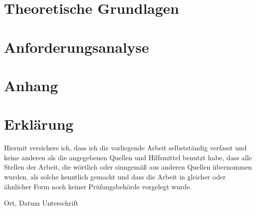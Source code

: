 \chapter{Theoretische Grundlagen}

\newpage
\chapter{Anforderungsanalyse}

\newpage


\appendix
\chapter{Anhang}




%


\chapter*{Erklärung}

Hiermit versichere ich, dass ich die vorliegende Arbeit selbstständig verfasst und keine anderen als die angegebenen Quellen und Hilfsmittel benutzt habe, dass alle Stellen der Arbeit, die wörtlich oder sinngemäß aus anderen Quellen übernommen wurden, als solche kenntlich gemacht und dass die Arbeit in gleicher oder ähnlicher Form noch keiner Prüfungsbehörde vorgelegt wurde.

\vspace{3cm}
Ort, Datum \hspace{5cm} Unterschrift\\

